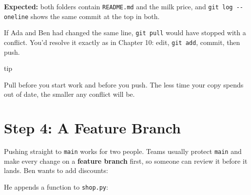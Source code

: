 \textbf{Expected:} both folders contain \texttt{README.md} and the milk price, and \texttt{git\ log\ -\/-oneline} shows the same commit at the top in both.

If Ada and Ben had changed the same line, \texttt{git\ pull} would have stopped with a conflict. You'd resolve it exactly as in Chapter 10: edit, \texttt{git\ add}, commit, then push.

\begin{callout}{tip}

Pull before you start work and before you push. The less time your copy spends out of date, the smaller any conflict will be.

\end{callout}


\section{Step 4: A Feature Branch}\label{11-lab-work-on-a-project-with-someone-else:step-4-a-feature-branch}

Pushing straight to \texttt{main} works for two people. Teams usually protect \texttt{main} and make every change on a \textbf{feature branch} first, so someone can review it before it lands. Ben wants to add discounts:

\begin{codeblock}

\begin{Shaded}
\begin{Highlighting}[]
\end{Highlighting}
\end{Shaded}

\end{codeblock}


He appends a function to \texttt{shop.py}:

\begin{codeblock}

\begin{Shaded}
\begin{Highlighting}[]
     \OperatorTok{*}\NormalTok{ (} \OperatorTok{{-}}\OperatorTok{/} \NormalTok{), }\NormalTok{)}
\end{Highlighting}
\end{Shaded}

\end{codeblock}

